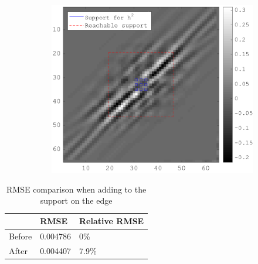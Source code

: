 \begin{figure}[!h]
\begin{subfigure}[b]{0.49\textwidth}
    \includegraphics[width=\textwidth]{figures/xp/xp_128x128_sc2_angl1_K3_S3_node2_gradient_node_2.png}
    \end{subfigure}
\end{figure}

\begin{table}[!h]\centering
\begin{tabular}{@{}lll@{}}\toprule
 & RMSE & Relative RMSE \\ \midrule
Before & 0.004786 & 0\% \\
After & 0.004407 & 7.9\% \\ \bottomrule
\end{tabular}
\caption{RMSE comparison when adding to the support on the  edge}
\end{table}


